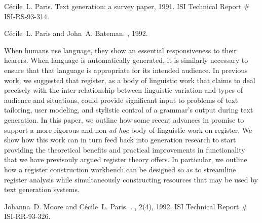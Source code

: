 \begin{thebibliography}{10}
\noindent\hspace*{\itemindent}{\leftskip=0.1in\rightskip=0.1in\hrulefill}

C\'ecile~L. Paris.
\newblock Text generation: a survey paper, 1991.
\newblock ISI Technical Report \# ISI-RS-93-314.

\noindent\hspace*{\itemindent}{\leftskip=0.1in\rightskip=0.1in\hrulefill}

C\'{e}cile~L. Paris and John~A. Bateman.
, 1992.

{\leftskip=0.1in\rightskip=0.1in\begin{small}\par{}When
  humans use language, they show an essential responsiveness to their hearers.
  When language is automatically generated, it is similarly necessary to ensure
  that that language is appropriate for its intended audience. In previous
  work, we suggested that register, as a body of linguistic work that claims to
  deal precisely with the inter-relationship between linguistic variation and
  types of audience and situations, could provide significant input to problems
  of text tailoring, user modeling, and stylistic control of a grammar's output
  during text generation. In this paper, we outline how some recent advances in
  promise to support a more rigorous and non-{\em ad hoc} body of linguistic
  work on register. We show how this work can in turn feed back into generation
  research to start providing the theoretical benefits and practical
  improvements in functionality that we have previsouly argued register theory
  offers. In particular, we outline how a register construction workbench can
  be designed so as to streamline register analysis while simultaneously
  constructing resources that may be used by text generation
  systems.\end{small}\par}
\noindent\hspace*{\itemindent}{\leftskip=0.1in\rightskip=0.1in\hrulefill}

Johanna~D. Moore and C\'{e}cile~L. Paris.
.
, 2(4), 1992.
\newblock ISI Technical Report \# ISI-RR-93-326.


\end{thebibliography}
